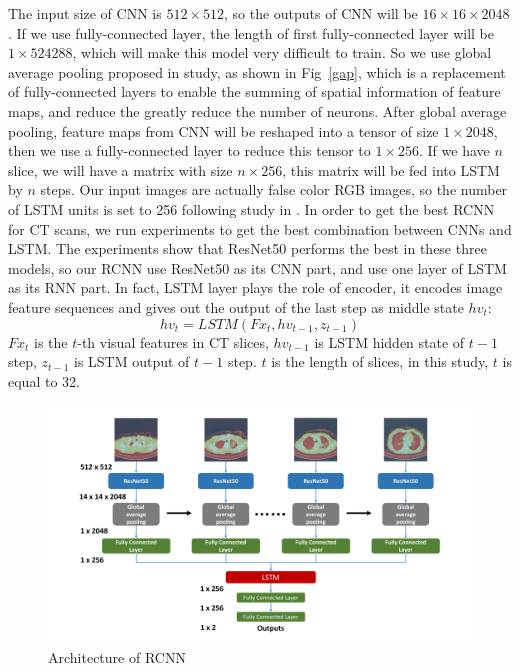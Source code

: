 \documentclass[runningheads]{llncs}
\begin{document}
The input size of CNN is $512 \times 512$, so the outputs of CNN will be $16 \times 16 \times 2048$. If we use fully-connected layer, the length of first fully-connected layer will be $1 \times 524288$, which will make this model very difficult to train. So we use global average pooling proposed in study\cite{lin2014network}, as shown in Fig~\ref{gap}, which is a replacement of fully-connected layers to enable the summing of spatial information of feature maps, and reduce the greatly reduce the number of neurons. 
After global average pooling, feature maps from CNN will be reshaped into a tensor of size $1 \times 2048$, then we use a fully-connected layer to reduce this tensor to $1 \times 256$. If we have $n$ slice, we will have a matrix with size $n \times 256$, this matrix will be fed into LSTM by $n$ steps.
Our input images are actually false color RGB images, so the number of LSTM units is set to 256 following study in \cite{Donahue2015Long}. In order to get the best RCNN for CT scans, we run experiments to get the best combination between CNNs and LSTM. The experiments show that ResNet50 performs the best in these three models, so our RCNN use ResNet50 as its CNN part, and use one layer of LSTM as its RNN part. In fact, LSTM layer plays the role of encoder, it encodes image feature sequences and gives out the output of the last step as middle state $hv_t$:
\begin{equation}
hv_t = LSTM(Fx_t, hv_{t-1}, z_{t-1})
\label{hvt}
\end{equation}
$Fx_t$ is the $t$-th visual features in CT slices, $hv_{t-1}$ is LSTM hidden state of $t-1$ step, $z_{t-1}$ is LSTM output of $t-1$ step. $t$ is the length of slices, in this study, $t$ is equal to 32.

\begin{figure}[htb]
    \centerline{\includegraphics[width=130mm]{onestream.pdf}}
    \vspace{-0cm}
    \caption{Architecture of RCNN}
    \vspace{-0cm}
    \label{onestream}
    \end{figure}
\end{document}
